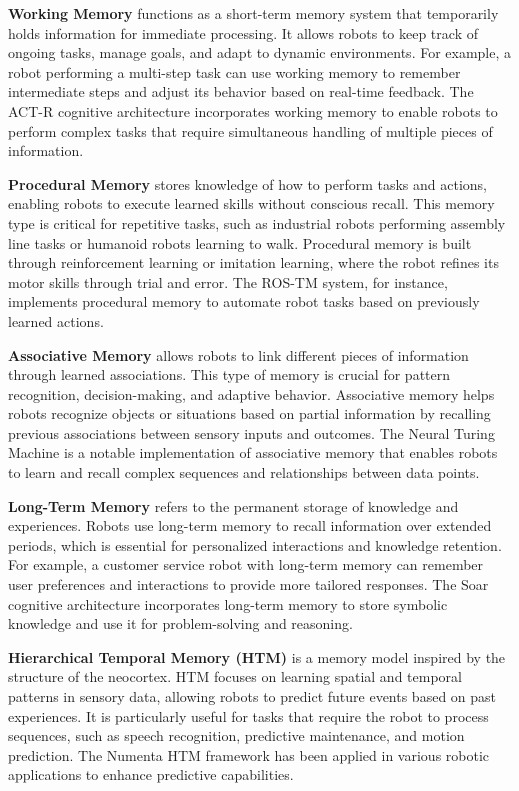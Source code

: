         \textbf{Working Memory} functions as a short-term memory system that temporarily holds information for immediate processing. It allows robots to keep track of ongoing tasks, manage goals, and adapt to dynamic environments. For example, a robot performing a multi-step task can use working memory to remember intermediate steps and adjust its behavior based on real-time feedback. The ACT-R cognitive architecture incorporates working memory to enable robots to perform complex tasks that require simultaneous handling of multiple pieces of information.
    
        \textbf{Procedural Memory} stores knowledge of how to perform tasks and actions, enabling robots to execute learned skills without conscious recall. This memory type is critical for repetitive tasks, such as industrial robots performing assembly line tasks or humanoid robots learning to walk. Procedural memory is built through reinforcement learning or imitation learning, where the robot refines its motor skills through trial and error. The ROS-TM system, for instance, implements procedural memory to automate robot tasks based on previously learned actions.
    
        \textbf{Associative Memory} allows robots to link different pieces of information through learned associations. This type of memory is crucial for pattern recognition, decision-making, and adaptive behavior. Associative memory helps robots recognize objects or situations based on partial information by recalling previous associations between sensory inputs and outcomes. The Neural Turing Machine is a notable implementation of associative memory that enables robots to learn and recall complex sequences and relationships between data points.
    
        \textbf{Long-Term Memory} refers to the permanent storage of knowledge and experiences. Robots use long-term memory to recall information over extended periods, which is essential for personalized interactions and knowledge retention. For example, a customer service robot with long-term memory can remember user preferences and interactions to provide more tailored responses. The Soar cognitive architecture incorporates long-term memory to store symbolic knowledge and use it for problem-solving and reasoning.
    
        \textbf{Hierarchical Temporal Memory (HTM)} is a memory model inspired by the structure of the neocortex. HTM focuses on learning spatial and temporal patterns in sensory data, allowing robots to predict future events based on past experiences. It is particularly useful for tasks that require the robot to process sequences, such as speech recognition, predictive maintenance, and motion prediction. The Numenta HTM framework has been applied in various robotic applications to enhance predictive capabilities.



